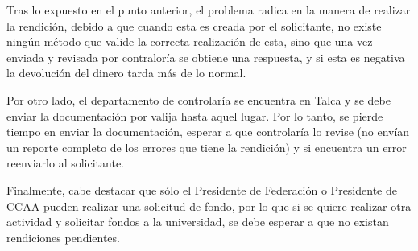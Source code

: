 Tras lo expuesto en el punto anterior, el problema radica en la manera de realizar la rendición, debido a que cuando esta es creada por el solicitante, no existe ningún método que valide la correcta realización de esta, sino que una vez enviada y revisada por contraloría se obtiene una respuesta, y si esta es negativa la devolución del dinero tarda más de lo normal.

Por otro lado, el departamento de controlaría se encuentra en Talca y se debe enviar la documentación por valija hasta aquel lugar. Por lo tanto, se pierde tiempo en enviar la documentación, esperar a que controlaría lo revise (no envían un reporte completo de los errores que tiene la rendición) y si encuentra un error reenviarlo al solicitante.

Finalmente, cabe destacar que sólo el Presidente de Federación o Presidente de CCAA pueden realizar una solicitud de fondo, por lo que si se quiere realizar otra actividad y solicitar fondos a la universidad, se debe esperar a que no existan rendiciones pendientes.